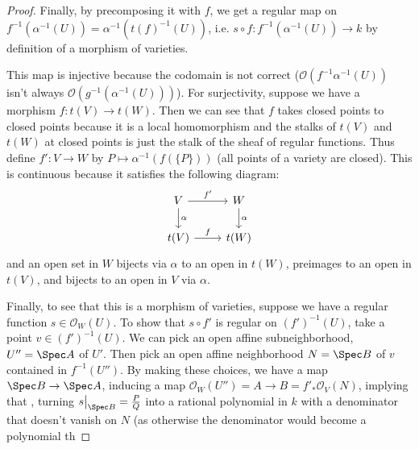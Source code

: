 \begin{proof}
	Finally, by precomposing it with $f$, we get a regular map on $f^{-1}(\alpha ^{-1}(U)) = \alpha ^{-1}(t(f)^{-1}(U)) $, i.e. $s\circ f: f^{-1}(\alpha ^{-1}(U)) \to k$ by definition of a morphism of varieties.

	This map is injective because the codomain is not correct ($\mathscr{O}(f^{-1}\alpha ^{-1}(U)) $ isn't always $\mathscr{O}(g^{-1}(\alpha ^{-1}(U))) $).
	For surjectivity, suppose we have a morphism $f: t(V) \to t(W) $.
	Then we can see that $f $ takes closed points to closed points because it is a local homomorphism and the stalks of $t(V) $ and $t(W) $ at closed points is just the stalk of the sheaf of regular functions.
	Thus define $f': V\to W $ by $P\mapsto \alpha ^{-1}(f(\{P\} ))  $ (all points of a variety are closed).
	This is continuous because it satisfies the following diagram:
	\[
	\begin{tikzcd}
	V & W\\
	t(V) & t(W)
	\arrow["f'",from=1-1,to=1-2]
	\arrow["\alpha",from=1-1,to=2-1]
	\arrow["f",from=2-1,to=2-2]
	\arrow["\alpha",from=1-2,to=2-2]
	\end{tikzcd}
	\]
	and an open set in $W $ bijects via $\alpha $ to an open in $t(W) $, preimages to an open in $t(V) $, and bijects to an open in $V $ via $\alpha $.

	Finally, to see that this is a morphism of varieties, suppose we have a regular function $s \in \mathscr{O}_W(U) $.
	To show that $s\circ f' $ is regular on $(f')^{-1}(U) $, take a point $v \in (f')^{-1}(U) $.
	We can pick an open affine subneighborhood, $U'' = \Spec A $ of $U' $.
	Then pick an open affine neighborhood $N=\Spec B$ of $v $ contained in $f^{-1}(U'') $.
	By making these choices, we have a map $\Spec B \to \Spec A $, inducing a map $\mathscr{O}_W(U'') = A \to B = f'_\ast\mathscr{O}_V(N) $, implying that 
	, turning $s\big|_{\Spec B} = \frac{P}{Q} $ into a rational polynomial in $k$ with a denominator that doesn't vanish on $N$ (as otherwise the denominator would become a polynomial th
\end{proof}

